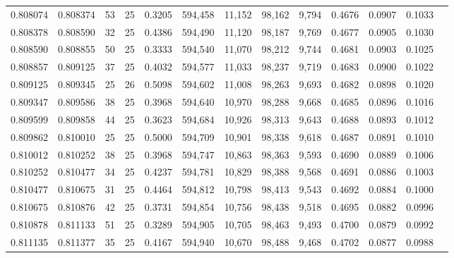 \begin{tabular}{rrrrrrrrrrrrr}
0.808074 & 0.808374 &    53 &  25 &                                     0.3205 & 594,458 &  11,152 &  98,162 &   9,794 & 0.4676 & 0.0907 & 0.1033 \\
0.808378 & 0.808590 &    32 &  25 &                                     0.4386 & 594,490 &  11,120 &  98,187 &   9,769 & 0.4677 & 0.0905 & 0.1030 \\
0.808590 & 0.808855 &    50 &  25 &                                     0.3333 & 594,540 &  11,070 &  98,212 &   9,744 & 0.4681 & 0.0903 & 0.1025 \\
0.808857 & 0.809125 &    37 &  25 &                                     0.4032 & 594,577 &  11,033 &  98,237 &   9,719 & 0.4683 & 0.0900 & 0.1022 \\
0.809125 & 0.809345 &    25 &  26 &                                     0.5098 & 594,602 &  11,008 &  98,263 &   9,693 & 0.4682 & 0.0898 & 0.1020 \\
0.809347 & 0.809586 &    38 &  25 &                                     0.3968 & 594,640 &  10,970 &  98,288 &   9,668 & 0.4685 & 0.0896 & 0.1016 \\
0.809599 & 0.809858 &    44 &  25 &                                     0.3623 & 594,684 &  10,926 &  98,313 &   9,643 & 0.4688 & 0.0893 & 0.1012 \\
0.809862 & 0.810010 &    25 &  25 &                                     0.5000 & 594,709 &  10,901 &  98,338 &   9,618 & 0.4687 & 0.0891 & 0.1010 \\
0.810012 & 0.810252 &    38 &  25 &                                     0.3968 & 594,747 &  10,863 &  98,363 &   9,593 & 0.4690 & 0.0889 & 0.1006 \\
0.810252 & 0.810477 &    34 &  25 &                                     0.4237 & 594,781 &  10,829 &  98,388 &   9,568 & 0.4691 & 0.0886 & 0.1003 \\
0.810477 & 0.810675 &    31 &  25 &                                     0.4464 & 594,812 &  10,798 &  98,413 &   9,543 & 0.4692 & 0.0884 & 0.1000 \\
0.810675 & 0.810876 &    42 &  25 &                                     0.3731 & 594,854 &  10,756 &  98,438 &   9,518 & 0.4695 & 0.0882 & 0.0996 \\
0.810878 & 0.811133 &    51 &  25 &                                     0.3289 & 594,905 &  10,705 &  98,463 &   9,493 & 0.4700 & 0.0879 & 0.0992 \\
0.811135 & 0.811377 &    35 &  25 &                                     0.4167 & 594,940 &  10,670 &  98,488 &   9,468 & 0.4702 & 0.0877 & 0.0988 \\

\end{tabular}
